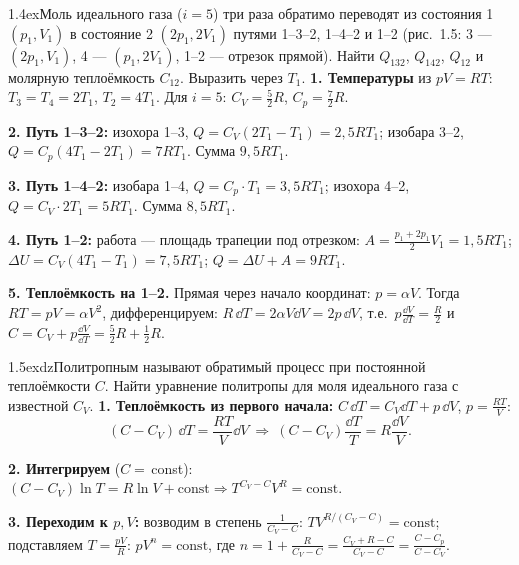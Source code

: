 \begin{problem}{1.4}{ex}{Моль идеального газа ($i=5$) три раза обратимо переводят из состояния 1 $(p_1,V_1)$ в состояние 2 $(2p_1,2V_1)$ путями 1--3--2, 1--4--2 и 1--2
(рис.~1.5: 3 — $(2p_1,V_1)$, 4 — $(p_1,2V_1)$, 1--2 — отрезок прямой). Найти $Q_{132}$, $Q_{142}$, $Q_{12}$ и молярную теплоёмкость $C_{12}$. Выразить через $T_1$.}
\textbf{1. Температуры} из $pV=RT$: $T_3=T_4=2T_1$, $T_2=4T_1$. Для $i=5$: $C_V=\frac52R$, $C_p=\frac72R$.

\textbf{2. Путь 1--3--2:} изохора 1--3, $Q=C_V(2T_1-T_1)=2{,}5RT_1$; изобара 3--2, $Q=C_p(4T_1-2T_1)=7RT_1$. Сумма $9{,}5RT_1$.

\textbf{3. Путь 1--4--2:} изобара 1--4, $Q=C_p\cdot T_1=3{,}5RT_1$; изохора 4--2, $Q=C_V\cdot2T_1=5RT_1$. Сумма $8{,}5RT_1$.

\textbf{4. Путь 1--2:} работа — площадь трапеции под отрезком: $A=\frac{p_1+2p_1}2V_1=1{,}5RT_1$; $\Delta U=C_V(4T_1-T_1)=7{,}5RT_1$; $Q=\Delta U+A=9RT_1$.

\textbf{5. Теплоёмкость на 1--2.} Прямая через начало координат: $p=\alpha V$. Тогда $RT=pV=\alpha V^2$, дифференцируем: $R\,\dd T=2\alpha V\dd V=2p\,\dd V$,
т.е.\ $p\frac{\dd V}{\dd T}=\frac R2$ и $C=C_V+p\frac{\dd V}{\dd T}=\frac52R+\frac12R$.
\end{problem}

\begin{problem}{1.5}{exdz}{Политропным называют обратимый процесс при постоянной теплоёмкости $C$. Найти уравнение политропы для моля идеального газа с известной $C_V$.}
\textbf{1. Теплоёмкость из первого начала:} $C\,\dd T=C_V\dd T+p\,\dd V$, $p=\frac{RT}V$:
\[(C-C_V)\,\dd T=\frac{RT}{V}\dd V\ \Rightarrow\ (C-C_V)\frac{\dd T}{T}=R\frac{\dd V}{V}.\]

\textbf{2. Интегрируем} ($C=$\,const): $(C-C_V)\ln T=R\ln V+\text{const}\Rightarrow T^{C_V-C}V^R=\text{const}$.

\textbf{3. Переходим к $p,V$:} возводим в степень $\frac1{C_V-C}$: $TV^{R/(C_V-C)}=\text{const}$; подставляем $T=\frac{pV}R$:
$pV^{n}=\text{const}$, где $n=1+\frac{R}{C_V-C}=\frac{C_V+R-C}{C_V-C}=\frac{C-C_p}{C-C_V}$.
\end{problem}

